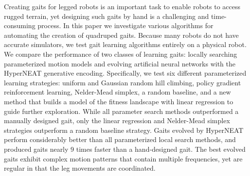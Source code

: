 Creating gaits for legged robots is an important task to enable robots
to access rugged terrain, yet designing such gaits by hand is a
challenging and time-consuming process. In this paper we investigate
various algorithms for automating the creation of quadruped
gaits. Because many robots do not have accurate simulators, we test
gait learning algorithms entirely on a physical robot.  We compare the
performance of two classes of learning gaits: locally searching
parameterized motion models and evolving artificial neural networks
with the HyperNEAT generative encoding. Specifically, we test six
different parameterized learning strategies: uniform and Gaussian
random hill climbing, policy gradient reinforcement learning,
Nelder-Mead simplex, a random baseline, and a new method that builds a
model of the fitness landscape with linear regression to guide further
exploration.  While all parameter search methods outperformed a
manually designed gait, only the linear regression and Nelder-Mead
simplex strategies outperform a random baseline strategy. Gaits
evolved by HyperNEAT perform considerably better than all
parameterized local search methods, and produced gaits nearly 9 times faster than a hand-designed gait.  The best evolved gaits exhibit
complex motion patterns that contain multiple frequencies, yet are
regular in that the leg movements are coordinated.


